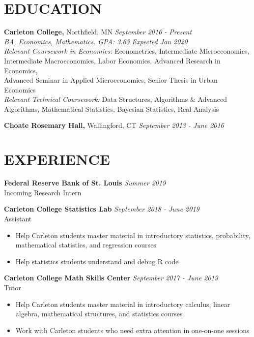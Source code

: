 \documentclass[margin, 10.85pt]{res} %
\begin{document}
\begin{resume}



\section{EDUCATION}

{\sl} \textbf{Carleton College,} Northfield, MN \hfill \textit{September 2016 - Present}\smallskip\\
{\sl BA, Economics, Mathematics. GPA: 3.63} \hfill \textit{Expected Jan 2020}\smallskip\\
{\sl Relevant Coursework in Economics: } Econometrics, Intermediate Microeconomics, Intermediate Macroeconomics, Labor Economics, Advanced Research in Economics,\\Advanced Seminar in Applied Microeconomics, Senior Thesis in Urban Economics\smallskip\\
{\sl Relevant Technical Coursework: } Data Structures, Algorithms \& Advanced Algorithms, Mathematical Statistics, Bayesian Statistics, Real Analysis

{\sl} \textbf{Choate Rosemary Hall,} Wallingford, CT \hfill \textit{September 2013 - June 2016}\smallskip\\

\section{EXPERIENCE}
{\sl} \textbf{Federal Reserve Bank of St. Louis} \hfill \textit{Summer 2019}\smallskip\\
{\sl} Incoming Research Intern \smallskip


{\sl} \textbf{Carleton College Statistics Lab} \hfill \textit{September 2018 - June 2019}\smallskip\\
{\sl} Assistant \smallskip
{\sl} \begin{itemize}
\item Help Carleton students master material in introductory statistics, probability, mathematical statistics, and regression courses
\item Help statistics students understand and debug R code
\end{itemize}

{\sl} \textbf{Carleton College Math Skills Center} \hfill \textit{September 2017 - June 2019}\smallskip\\
{\sl} Tutor \smallskip
{\sl} \begin{itemize}
\item Help Carleton students master material in introductory calculus, linear algebra, mathematical structures, and statistics courses
\item Work with Carleton students who need extra attention in one-on-one sessions
\end{itemize}


\end{resume}
\end{document}
